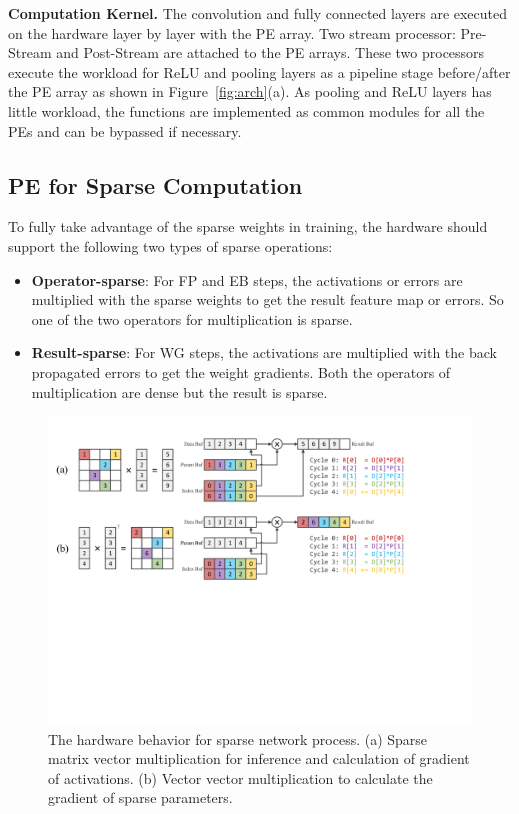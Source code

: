 {\bf Computation Kernel.} The convolution and fully connected layers are executed on the hardware layer by layer with the PE array. Two stream processor: Pre-Stream and Post-Stream are attached to the PE arrays. These two processors execute the workload for ReLU and pooling layers as a pipeline stage before/after the PE array as shown in Figure~\ref{fig:arch}(a). As pooling and ReLU layers has little workload, the functions are implemented as common modules for all the PEs and can be bypassed if necessary.

\subsection{PE for Sparse Computation}\label{sec:hw_pe}

To fully take advantage of the sparse weights in training, the hardware should support the following two types of sparse operations:
\begin{itemize}
\item {\bf Operator-sparse}: For FP and EB steps, the activations or errors are multiplied with the sparse weights to get the result feature map or errors. So one of the two operators for multiplication is sparse.
\item {\bf Result-sparse}: For WG steps, the activations are multiplied with the back propagated errors to get the weight gradients. Both the operators of multiplication are dense but the result is sparse.
\end{itemize}

\begin{figure}[htbp] 
  \centering
  \includegraphics[width=1.8\columnwidth]{figures/sparse_mv.pdf}
  \caption{The hardware behavior for sparse network process. (a) Sparse matrix vector multiplication for inference and calculation of gradient of activations. (b) Vector vector multiplication to calculate the gradient of sparse parameters. }
  \label{fig:spmv}
\end{figure}

